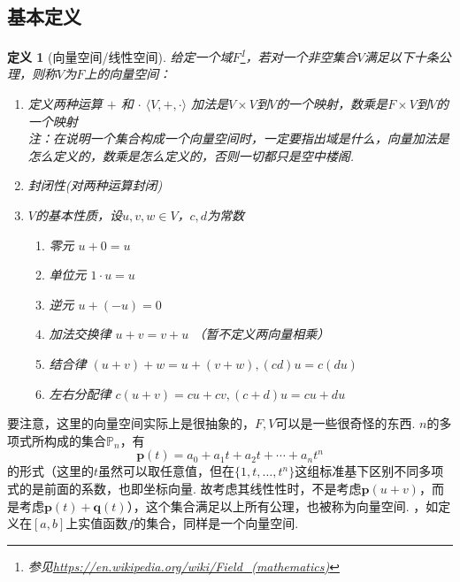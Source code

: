 \documentclass[11pt,UTF8]{ctexart}
\newtheorem{definition}{定义}
\newcommand{\vb}[1]{\mathbf{#1}}
\begin{document}
\subsection{基本定义}
\begin{definition}[向量空间/线性空间]
给定一个域$F$\footnote{参见\url{https://en.wikipedia.org/wiki/Field_(mathematics)}}，若对一个非空集合$V$满足以下十条公理，则称$V$为$F$上的向量空间：
\begin{enumerate}
	\itemsep -3pt
	\item 定义两种运算 $+$ 和 $\cdot$
		$ \langle V , +, \cdot \rangle$
		加法是$V\times V$到$V$的一个映射，数乘是$F\times V$到$V$的一个映射\\
		注：在说明一个集合构成一个向量空间时，一定要指出域是什么，向量加法是怎么定义的，数乘是怎么定义的，否则一切都只是空中楼阁.
	\item 封闭性(对两种运算封闭)
	\item $V$的基本性质，设$u,v,w\in V$，$c,d$为常数
		\begin{enumerate}
			\itemsep -3pt
			\item 零元 $u+0=u$
			\item 单位元 $1\cdot u=u$
			\item 逆元 $u+(-u)=0$
			\item 加法交换律 $u+v=v+u$ （暂不定义两向量相乘）
			\item 结合律 $(u+v)+w=u+(v+w),(cd)u=c(du)$
			\item 左右分配律 $c(u+v)=cu+cv,(c+d)u=cu+du$
		\end{enumerate}
\end{enumerate}
\end{definition}
要注意，这里的向量空间实际上是很抽象的，$F,V$可以是一些很奇怪的东西.
$n$的多项式所构成的集合$\mathbb{P}_n$，有
\[\mathbf{p}(t)=a_0+a_1t+a_2t+\cdots+a_nt^n\]
的形式（这里的$t$虽然可以取任意值，但在$\{1,t,\dots,t^n\}$这组标准基下区别不同多项式的是前面的系数，也即坐标向量. 故考虑其线性性时，不是考虑$\vb{p}(u+v)$，而是考虑$\vb{p}(t)+\vb{q}(t)$），这个集合满足以上所有公理，也被称为向量空间.
，如定义在$[a,b]$上实值函数$f$的集合，同样是一个向量空间.
\end{document}
